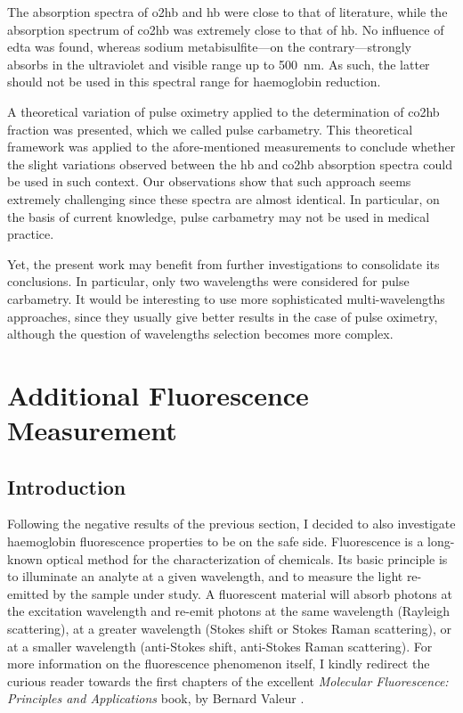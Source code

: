 The absorption spectra of \gls{o2hb} and \gls{hb} were close to that of literature, while the absorption spectrum of \gls{co2hb} was extremely close to that of \gls{hb}. No influence of \gls{edta} was found, whereas sodium metabisulfite---on the contrary---strongly absorbs in the ultraviolet and visible range up to 500~nm. As such, the latter should not be used in this spectral range for haemoglobin reduction.

A theoretical variation of pulse oximetry applied to the determination of \gls{co2hb} fraction was presented, which we called pulse carbametry. This theoretical framework was applied to the afore-mentioned measurements to conclude whether the slight variations observed between the \gls{hb} and \gls{co2hb} absorption spectra could be used in such context. Our observations show that such approach seems extremely challenging since these spectra are almost identical. In particular, on the basis of current knowledge, pulse carbametry may not be used in medical practice.

Yet, the present work may benefit from further investigations to consolidate its conclusions. In particular, only two wavelengths were considered for pulse carbametry. It would be interesting to use more sophisticated multi-wavelengths approaches, since they usually give better results in the case of pulse oximetry\cite{katja2011}, although the question of wavelengths selection becomes more complex\cite{brunelle1996, brendel2009}.

\section{Additional Fluorescence Measurement}\label{sect:co2hb:fluo}

\subsection{Introduction}

Following the negative results of the previous section, I decided to also investigate haemoglobin fluorescence properties to be on the safe side. Fluorescence is a long-known optical method for the characterization of chemicals. Its basic principle is to illuminate an analyte at a given wavelength, and to measure the light re-emitted by the sample under study. A fluorescent material will absorb photons at the excitation wavelength and re-emit photons at the same wavelength (Rayleigh scattering), at a greater wavelength (Stokes shift or Stokes Raman scattering), or at a smaller wavelength (anti-Stokes shift, anti-Stokes Raman scattering). For more information on the fluorescence phenomenon itself, I kindly redirect the curious reader towards the first chapters of the excellent \textit{Molecular Fluorescence: Principles and Applications} book, by Bernard Valeur \etal{}\cite{valeur2012molecfluo}.

